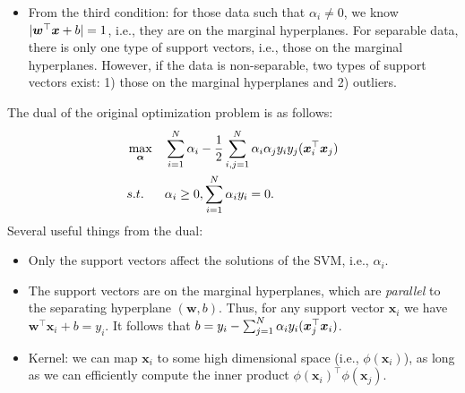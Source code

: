 {\begin{itemize}
                \item From the third condition: for those data such that $\alpha_i \ne 0$, we know $| \bm{w}^\top \bm{x} + b | = 1$, i.e., they are on the marginal hyperplanes.
                For separable data, there is only one type of support vectors, i.e., those on the marginal hyperplanes. However, if the data is non-separable, two types of support vectors exist: 1) those on the marginal hyperplanes and 2) outliers. 
            \end{itemize}
        The dual of the original optimization problem is as follows:
            \begin{equation}
                \begin{aligned}
                    & \max_{\bm{\alpha}} & & \sum_{i=1}^{N}{\alpha_i} - \frac{1}{2}\sum_{i,j=1}^{N}{\alpha_i \alpha_j y_i y_j (\bm{x}_i^\top \bm{x}_j) } \\
                    & s.t. & & \alpha_i \ge 0, \sum_{i=1}^{N}{\alpha_i y_i} = 0.
                \end{aligned}
            \end{equation}
        Several useful things from the dual:
        \begin{itemize}
            \item Only the support vectors  affect the solutions of the SVM, i.e., $\alpha_i$.
            \item The support vectors are on the marginal hyperplanes, which are \emph{parallel} to the separating hyperplane $(\bm{w}, b)$.
            Thus, for any support vector $\bm{x}_i$ we have $\bm{w}^\top \bm{x}_i + b = y_i$.
            It follows that $b = y_i - \sum_{j=1}^{N}{\alpha_i y_i (\bm{x}_j^\top \bm{x}_i) }$.
            \item Kernel: we can map $\bm{x}_i$ to some high dimensional space (i.e., $\phi(\bm{x}_i)$), as long as we can efficiently compute the inner product $\phi(\bm{x}_i)^\top \phi(\bm{x}_j)$.
        \end{itemize}
}
